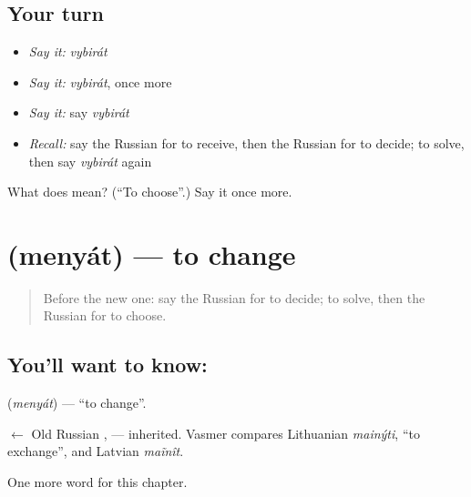 \subsection*{Your turn}
\begin{itemize}
\raggedright
  \item \emph{Say it:} \emph{vybirát}
  \item \emph{Say it:} \emph{vybirát}, once more
  \item \emph{Say it:} say \emph{vybirát}
  \item \emph{Recall:} say the Russian for to receive, then the Russian for to decide; to solve, then say \emph{vybirát} again
\end{itemize}

\begin{tcolorbox}[breakable,colback=teal!4,colframe=teal!35!black,title={Before you move on}]
What does  mean? (\textquotedblleft{}To choose\textquotedblright{}.) Say it once more.
\end{tcolorbox}
\section[\texorpdfstring{\ru{менять} (menyát)}{менять (menyát)}]{ (menyát) — to change}

\label{lesson:RU-C233-menyat}



\begin{quote}
Before the new one: say the Russian for to decide; to solve, then the Russian for to choose.
\end{quote}

\subsection*{You'll want to know: }
\textbf{} (\emph{menyát}) — \textquotedblleft{}to change\textquotedblright{}.

\begin{cousinweb}
\textbf{} $\leftarrow$ Old Russian \emph{}, \emph{} — inherited. Vasmer compares Lithuanian \emph{mainýti}, \textquotedblleft{}to exchange\textquotedblright{}, and Latvian \emph{maĩnît}.
\end{cousinweb}

\begin{grammarlens}[title={What you've built}]
One more word for this chapter.
\end{grammarlens}

